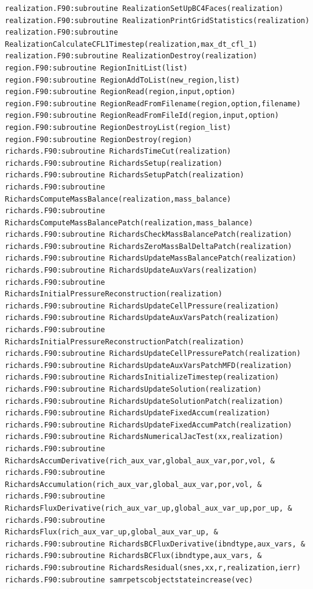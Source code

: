 \documentclass[12pt]{article}
\begin{document}
\begin{verbatim}
realization.F90:subroutine RealizationSetUpBC4Faces(realization)
realization.F90:subroutine RealizationPrintGridStatistics(realization)
realization.F90:subroutine RealizationCalculateCFL1Timestep(realization,max_dt_cfl_1)
realization.F90:subroutine RealizationDestroy(realization)
region.F90:subroutine RegionInitList(list)
region.F90:subroutine RegionAddToList(new_region,list)
region.F90:subroutine RegionRead(region,input,option)
region.F90:subroutine RegionReadFromFilename(region,option,filename)
region.F90:subroutine RegionReadFromFileId(region,input,option)
region.F90:subroutine RegionDestroyList(region_list)
region.F90:subroutine RegionDestroy(region)
richards.F90:subroutine RichardsTimeCut(realization)
richards.F90:subroutine RichardsSetup(realization)
richards.F90:subroutine RichardsSetupPatch(realization)
richards.F90:subroutine RichardsComputeMassBalance(realization,mass_balance)
richards.F90:subroutine RichardsComputeMassBalancePatch(realization,mass_balance)
richards.F90:subroutine RichardsCheckMassBalancePatch(realization)
richards.F90:subroutine RichardsZeroMassBalDeltaPatch(realization)
richards.F90:subroutine RichardsUpdateMassBalancePatch(realization)
richards.F90:subroutine RichardsUpdateAuxVars(realization)
richards.F90:subroutine RichardsInitialPressureReconstruction(realization)
richards.F90:subroutine RichardsUpdateCellPressure(realization)
richards.F90:subroutine RichardsUpdateAuxVarsPatch(realization)
richards.F90:subroutine RichardsInitialPressureReconstructionPatch(realization)
richards.F90:subroutine RichardsUpdateCellPressurePatch(realization)
richards.F90:subroutine RichardsUpdateAuxVarsPatchMFD(realization)
richards.F90:subroutine RichardsInitializeTimestep(realization)
richards.F90:subroutine RichardsUpdateSolution(realization)
richards.F90:subroutine RichardsUpdateSolutionPatch(realization)
richards.F90:subroutine RichardsUpdateFixedAccum(realization)
richards.F90:subroutine RichardsUpdateFixedAccumPatch(realization)
richards.F90:subroutine RichardsNumericalJacTest(xx,realization)
richards.F90:subroutine RichardsAccumDerivative(rich_aux_var,global_aux_var,por,vol, &
richards.F90:subroutine RichardsAccumulation(rich_aux_var,global_aux_var,por,vol, &
richards.F90:subroutine RichardsFluxDerivative(rich_aux_var_up,global_aux_var_up,por_up, &
richards.F90:subroutine RichardsFlux(rich_aux_var_up,global_aux_var_up, &
richards.F90:subroutine RichardsBCFluxDerivative(ibndtype,aux_vars, &
richards.F90:subroutine RichardsBCFlux(ibndtype,aux_vars, &
richards.F90:subroutine RichardsResidual(snes,xx,r,realization,ierr)
richards.F90:subroutine samrpetscobjectstateincrease(vec)

\end{verbatim}
\end{document}
